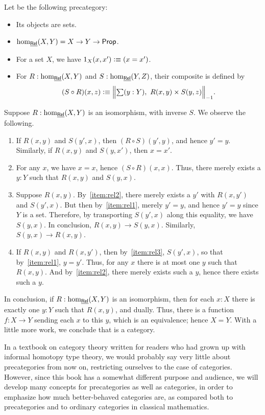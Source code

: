 \begin{eg}\label{ct:rel}
  Let \urel be the following precategory:
  \begin{itemize}
  \item Its objects are sets.
  \item $\hom_{\underline{\mathsf{Rel}}}(X,Y) = X\to Y\to \mathsf{Prop}$.
  \item For a set $X$, we have $1_X(x,x') \vcentcolon\equiv (x=x')$.
  \item For $R:\hom_{\underline{\mathsf{Rel}}}(X,Y)$ and $S:\hom_{\underline{\mathsf{Rel}}}(Y,Z)$, their composite is defined by
    \[ (S\circ R)(x,z) \defeq \Brck{\sm{y:Y} R(x,y) \times S(y,z)}.\]
  \end{itemize}
  Suppose $R:\hom_{\underline{\mathsf{Rel}}}(X,Y)$ is an isomorphism, with inverse $S$.
  We observe the following.
  \begin{enumerate}
  \item If $R(x,y)$ and $S(y',x)$, then $(R\circ S)(y',y)$, and hence $y'=y$.
    Similarly, if $R(x,y)$ and $S(y,x')$, then $x=x'$.\label{item:rel1}
  \item For any $x$, we have $x=x$, hence $(S\circ R)(x,x)$.
    Thus, there merely exists a $y:Y$ such that $R(x,y)$ and $S(y,x)$.\label{item:rel2}
  \item Suppose $R(x,y)$.
    By~\ref{item:rel2}, there merely exists a $y'$ with $R(x,y')$ and $S(y',x)$.
    But then by~\ref{item:rel1}, merely $y'=y$, and hence $y'=y$ since $Y$ is a set.
    Therefore, by transporting $S(y',x)$ along this equality, we have $S(y,x)$.
    In conclusion, $R(x,y)\to S(y,x)$.
    Similarly, $S(y,x) \to R(x,y)$.\label{item:rel3}
  \item If $R(x,y)$ and $R(x,y')$, then by~\ref{item:rel3}, $S(y',x)$, so that by~\ref{item:rel1}, $y=y'$.
    Thus, for any $x$ there is at most one $y$ such that $R(x,y)$.
    And by~\ref{item:rel2}, there merely exists such a $y$, hence there exists such a $y$.
  \end{enumerate}
  In conclusion, if $R:\hom_{\underline{\mathsf{Rel}}}(X,Y)$ is an isomorphism, then for each $x:X$ there is exactly one $y:Y$ such that $R(x,y)$, and dually.
  Thus, there is a function $f:X\to Y$ sending each $x$ to this $y$, which is an equivalence; hence $X=Y$.
  With a little more work, we conclude that \urel is a category.
\end{eg}

In a textbook on category theory written for readers who had grown up with informal homotopy type theory, we would probably say very little about precategories from now on, restricting ourselves to the case of categories.
However, since this book has a somewhat different purpose and audience, we will develop many concepts for precategories as well as categories, in order to emphasize how much better-behaved categories are, as compared both to precategories and to ordinary categories in classical mathematics.

